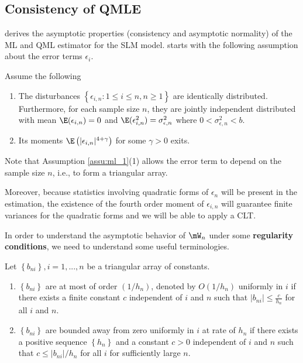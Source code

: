 \documentclass[english,12pt]{book}\usepackage[]{graphicx}\usepackage[]{xcolor}
\begin{document}
\subsection{Consistency of QMLE}


\cite{lee2004asymptotic} derives the asymptotic properties (consistency and asymptotic normality) of the ML and QML estimator for the SLM model. \cite{lee2004asymptotic} starts with the following assumption about the error terms $\epsilon_{i}$. 

\begin{assumption}[Errors]\label{assu:ml_1}
Assume the following
  \begin{enumerate}
    \item The disturbances $\left\lbrace \epsilon_{i,n}: 1 \leq i \leq n, n\geq 1\right\rbrace$ are identically distributed. Furthermore, for each sample size $n$, they are jointly independent distributed with mean $ \E(\epsilon_{i, n}) = 0$ and $\E(\epsilon_{i, n}^2)=\sigma^2_{\epsilon, n}$ where $0 < \sigma^2_{\epsilon, n} < b$. 
    \item Its moments $\E\left(|\epsilon_{i,n}|^{4 + \gamma}\right)$ for some $\gamma > 0$ exits.
  \end{enumerate}  
\end{assumption}

Note that Assumption \ref{assu:ml_1}(1) allows the error term to depend on the sample size $n$, i.e., to form a triangular array. %

Moreover, because statistics involving quadratic forms of $\epsilon_n$ will be present in the estimation, the existence of the fourth order moment of $\epsilon_{i,n}$ will guarantee finite variances for the quadratic forms and we will be able to apply a CLT. 

In order to understand the asymptotic behavior of $\mW_n$ under some \textbf{regularity conditions}, we need to understand some useful terminologies.

\begin{definition}\label{def:tria_array_const}
Let $\left\lbrace b_{ni} \right\rbrace, i = 1,...,n$ be a triangular array of constants.

\begin{enumerate}
  \item $\left\lbrace b_{ni} \right\rbrace$ are at most of order $(1/h_n)$, denoted by $O(1/h_n)$ uniformly in $i$ if there exists a finite constant $c$ independent of $i$ and $n$ such that $\left|b_{ni}\right|\leq \frac{c}{h_n}$ for all $i$ and $n$.
  \item $\left\lbrace b_{ni} \right\rbrace$ are bounded away from zero uniformly in $i$ at rate of $h_n$ if there exists a positive sequence $\left\lbrace h_{n} \right\rbrace$ and a constant $c>0$ independent of $i$ and $n$ such that $c\leq \left|b_{ni}\right|/ h_n$ for all $i$ for sufficiently large $n$.
\end{enumerate}
\end{definition}
\end{document}
